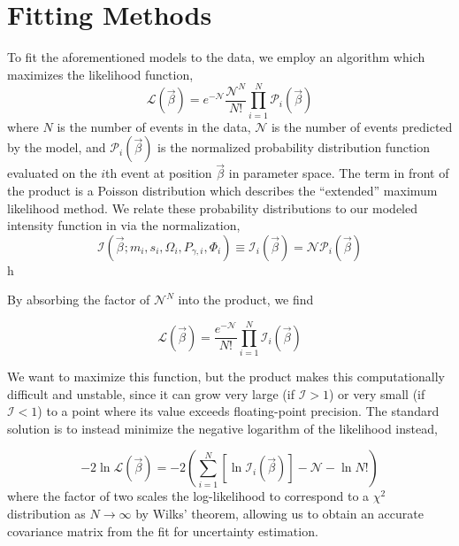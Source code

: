 \section{Fitting Methods}\label{sec:fitting-methods}

To fit the aforementioned models to the data, we employ an algorithm which maximizes the likelihood function,
\begin{equation}
  \mathcal{L}(\vec{\beta}) = e^{-\mathcal{N}} \frac{\mathcal{N}^N}{N!} \prod_{i=1}^{N} \mathcal{P}_i(\vec{\beta})
  \label{eq:likelihood}
\end{equation}
where $N$ is the number of events in the data, $\mathcal{N}$ is the number of events predicted by the model, and $\mathcal{P}_i(\vec{\beta})$ is the normalized probability distribution function evaluated on the $i$th event at position $\vec{\beta}$ in parameter space. The term in front of the product is a Poisson distribution which describes the ``extended'' maximum likelihood method. We relate these probability distributions to our modeled intensity function in  via the normalization,
\begin{equation}
  \mathcal{I}(\vec{\beta}; m_i, s_i, \Omega_i, P_{\gamma, i}, \Phi_i) \equiv \mathcal{I}_i(\vec{\beta}) = \mathcal{N}\mathcal{P}_i(\vec{\beta})
\end{equation}                                       h

By absorbing the factor of $\mathcal{N}^N$ into the product, we find

\begin{equation}
  \mathcal{L}(\vec{\beta}) = \frac{e^{-\mathcal{N}}}{N!} \prod_{i=1}^{N} \mathcal{I}_i(\vec{\beta})
\end{equation}

We want to maximize this function, but the product makes this computationally difficult and unstable, since it can grow very large (if $\mathcal{I} > 1$) or very small (if $\mathcal{I} < 1$) to a point where its value exceeds floating-point precision. The standard solution is to instead minimize the negative logarithm of the likelihood instead,

\begin{equation}
  -2 \ln \mathcal{L}(\vec{\beta}) = -2 \left(\sum_{i=1}^{N} \left[\ln \mathcal{I}_i(\vec{\beta})\right] - \mathcal{N} - \ln N! \right)
\end{equation}
where the factor of two scales the log-likelihood to correspond to a $\chi^2$ distribution as $N \to \infty$ by Wilks' theorem, allowing us to obtain an accurate covariance matrix from the fit for uncertainty estimation.

